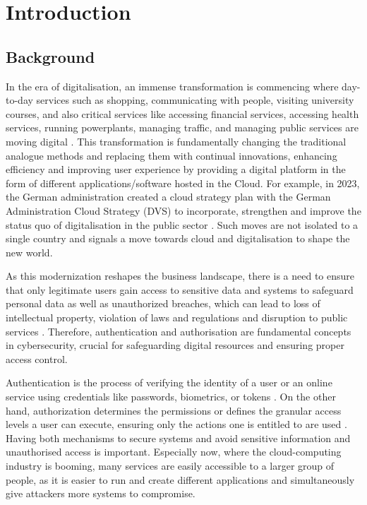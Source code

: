 \chapter{Introduction}
\section{Background}
In the era of digitalisation, an immense transformation is commencing where day-to-day services such as shopping, communicating with people, visiting university courses, and also critical services like accessing financial services, accessing health services, running powerplants, managing traffic, and managing public services are moving digital \citep{intro_cloud_critical_infra}. This transformation is fundamentally changing the traditional analogue methods and replacing them with continual innovations, enhancing efficiency and improving user experience by providing a digital platform in the form of different applications/software hosted in the Cloud. For example, in 2023, the German administration created a cloud strategy plan with the German Administration Cloud Strategy (DVS) to incorporate, strengthen and improve the status quo of digitalisation in the public sector \citep{german_gov_cloud_plan}. Such moves are not isolated to a single country and signals a move towards cloud and digitalisation to shape the new world. \newline

As this modernization reshapes the business landscape, there is a need to ensure that only legitimate users gain access to sensitive data and systems to safeguard personal data as well as unauthorized breaches, which can lead to loss of intellectual property, violation of laws and regulations and disruption to public services \citep{critical_infra_reason}. Therefore, authentication and authorisation are fundamental concepts in cybersecurity, crucial for safeguarding digital resources and ensuring proper access control. \newline

Authentication is the process of verifying the identity of a user or an online service using credentials like passwords, biometrics, or tokens \citep{authetication_intro}. On the other hand, authorization determines the permissions or defines the granular access levels a user can execute, ensuring only the actions one is entitled to are used \citep{Gollmann2021-at}. Having both mechanisms to secure systems and avoid sensitive information and unauthorised access is important. Especially now, where the cloud-computing industry is booming, many services are easily accessible to a larger group of people, as it is easier to run and create different applications and simultaneously give attackers more systems to compromise.\newline

